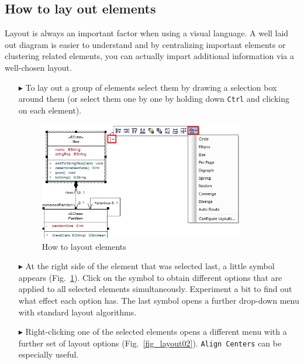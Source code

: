 \subsection{How to lay out elements}

Layout is always an important factor when using a visual language. A well laid out diagram is easier to understand and by centralizing important elements or
clustering related elements, you can actually impart additional information via a well-chosen layout.

\begin{enumerate}
\item[$\blacktriangleright$] To lay out a group of elements select them by drawing a selection box around them (or select them one by one by holding down
\texttt{Ctrl} and clicking on each element).

\begin{figure}[htbp]
\begin{center} 
  \includegraphics[width=0.85\textwidth]{layoutElements1}
  \caption{How to layout elements}  
  \label{fig_layout01}
\end{center}
\end{figure}
 
\item[$\blacktriangleright$] At the right side of the element that was selected last, a little symbol appears (Fig.~\ref{fig_layout01}). Click on the symbol to
obtain different options that are applied to all selected elements simultaneously. Experiment a bit to find out what effect each option has. The last symbol
opens a further drop-down menu with standard layout algorithms.

\newpage

\item[$\blacktriangleright$] Right-clicking one of the selected elements opens a different menu with a further set of layout options (Fig.~\ref{fig_layout02}).
\texttt{Align Centers} can be especially useful.


\end{enumerate}
